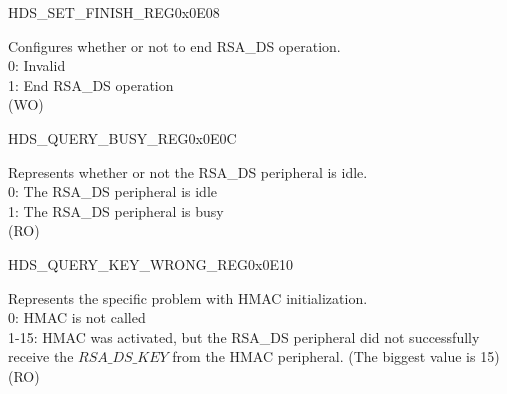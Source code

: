 \begin{register}{H}{DS\_SET\_FINISH\_REG}{0x0E08}\label{regdesc:DSSETFINISHREG}
%
%
\regnewline%
\begin{regdesc}\begin{reglist}
\item [DS\_SET\_FINISH] Configures whether or not to end RSA\_DS operation. \\
0: Invalid\\
1: End RSA\_DS operation\\
(WO)
\end{reglist}\end{regdesc}
\end{register}



\begin{register}{H}{DS\_QUERY\_BUSY\_REG}{0x0E0C}\label{regdesc:DSQUERYBUSYREG}
%
%
\regnewline%
\begin{regdesc}\begin{reglist}
\item [DS\_QUERY\_BUSY] Represents whether or not the RSA\_DS peripheral is idle.\\
0: The RSA\_DS peripheral is idle\\
1: The RSA\_DS peripheral is busy\\
(RO)
\end{reglist}\end{regdesc}
\end{register}



\begin{register}{H}{DS\_QUERY\_KEY\_WRONG\_REG}{0x0E10}\label{regdesc:DSQUERYKEYWRONGREG}
%
%
\regnewline%
\begin{regdesc}\begin{reglist}
\item [DS\_QUERY\_KEY\_WRONG] Represents the specific problem with HMAC initialization.\\
0: HMAC is not called\\
1-15: HMAC was activated, but the RSA\_DS peripheral did not successfully receive the \begin{math}RSA\_DS\_KEY\end{math} from the HMAC peripheral. (The biggest value is 15)\\
(RO)
\end{reglist}\end{regdesc}
\end{register}




